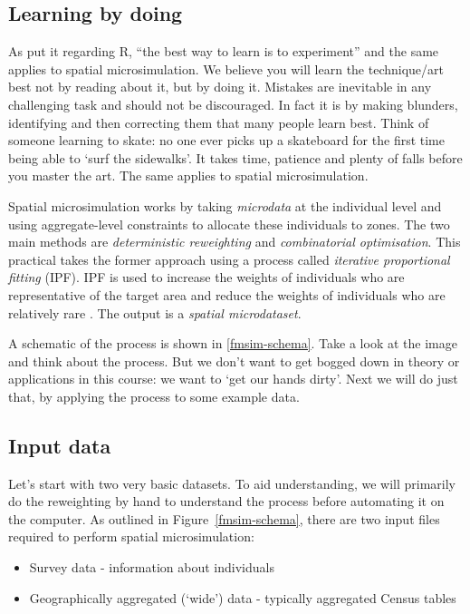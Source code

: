 \documentclass[a4paper, 11pt, twoside]{article}
\begin{document}
\subsection{Learning by doing}
As \citet[xxii]{kabacoff2011r} put it regarding R, ``the best
way to learn is to experiment'' and the same applies to spatial microsimulation.
We believe you will learn the technique/art best not by reading about it, 
but by doing it. Mistakes are inevitable in any challenging task and should not
be discouraged. In fact it is by making blunders, identifying and then correcting them
that many people learn best. Think of someone learning to skate: no one ever
picks up a skateboard for the first time being able to `surf the sidewalks'. It
takes time, patience and plenty of falls before you master the art.
The same applies to spatial microsimulation.

Spatial microsimulation works by taking \emph{microdata} at the individual level
and using aggregate-level constraints to allocate these individuals to zones.
The two main methods are \emph{deterministic reweighting} and \emph{combinatorial optimisation}.
This practical takes the former approach using a process called \emph{iterative proportional fitting}
(IPF). IPF is used to increase the weights of individuals who are representative
of the target area and reduce the weights of individuals who are relatively
rare \citep{Lovelace2013-trs}.
The output is a \emph{spatial microdataset}.

A schematic of the process is shown in \cref{fmsim-schema}.
Take a look at the image and think about the process. But we don't want to get
bogged down in theory or applications in this course: we want to `get our
hands dirty'. Next we will do just that, by applying the process to some
example data.

\subsection{Input data} \label{s:theory}

Let's start with two very basic datasets. To aid understanding, we will primarily do
the reweighting by hand to understand the process before automating it on the computer.
As outlined in Figure~\ref{fmsim-schema},
there are two input files required to perform spatial microsimulation:
\begin{itemize}
  \item Survey data - information about individuals
  \item Geographically aggregated (`wide') data - typically aggregated Census tables
\end{itemize}
\end{document}
